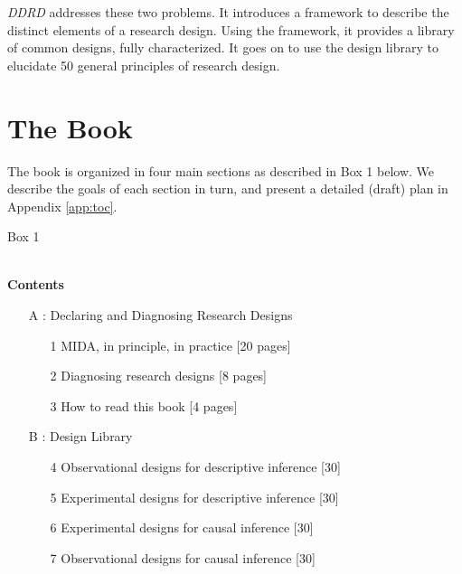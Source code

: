 \documentclass[11pt]{article}
\begin{document}
{\it DDRD} addresses these two problems. It introduces a framework to describe the distinct elements of a research design. Using the framework, it provides a library of common designs, fully characterized. It goes on to use the design library to elucidate 50 general principles of research design.
\newpage
\section{The Book}

The book is organized in four main sections as described in Box 1 below. We describe the goals of each section in turn, and present a detailed (draft) plan in Appendix \ref{app:toc}.

\begin{framed}
\begin{centering} Box 1 \end{centering}\\

	\noindent\textbf{Contents}
	\begin{enumerate}
		\item[A]: Declaring and Diagnosing Research Designs
		
		\begin{enumerate}
			\item[1] MIDA, in principle, in practice [20 pages]
			\item[2] Diagnosing research designs [8 pages]
			\item[3] How to read this book [4 pages]
		\end{enumerate}
		
		\item[B]: Design Library
		\begin{enumerate}
			\item[4] Observational designs for descriptive inference [30]
			\item[5] Experimental designs for descriptive inference [30]
			\item[6] Experimental designs for causal inference [30]
			\item[7] Observational designs for causal inference [30]
		\end{enumerate}
		

\end{enumerate}
\end{framed}
\end{document}
